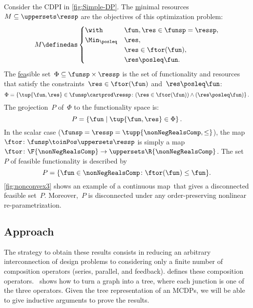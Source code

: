 \begin{example}
    \label{exa:one}
    Consider the CDPI in \cref{fig:Simple-DP}.
    The \uline{m}inimal resources~$M\subseteq\uppersets \ressp$ are the objectives of this optimization problem:
    \begin{equation*}
        M\definedas\begin{cases}
            \with          & \fun,\res\in\funsp=\ressp, \\
            \Min_{\posleq} & \res,                      \\
                           & \res\in\ftor(\fun),        \\
                           & \res\posleq\fun.
        \end{cases}
    \end{equation*}
    The \uline{fea}sible set~$\Phi\subseteq\funsp\times\ressp$ is the set of functionality and resources that satisfy the constraints~$\res\in\ftor(\fun)$ and~$\res\posleq\fun$:
    \begin{equation}
        \Phi=\left\{ \tup{\fun,\res}\in\funsp\cartprod\ressp\colon (\res\in\ftor(\fun))\wedge(\res\posleq\fun)\right\} .\label{eq:feasible}
    \end{equation}
    The \uline{p}rojection~$P$ of~$\Phi$ to the functionality space is:
    \begin{equation*}
        P=\left\{ \fun\mid\tup{\fun,\res} \in\Phi\right\}.
    \end{equation*}
    In the scalar case ($\funsp=\ressp=\tupp{\nonNegRealsComp,\leq}$), the map~$\ftor\colon\funsp\toinPos\uppersets \ressp$ is simply a map~$\ftor\colon\F{\nonNegRealsComp}\to \uppersets\R{\nonNegRealsComp}$.
    The set~$P$ of feasible functionality is described by
    \begin{equation}
        P=\{\fun\in\nonNegRealsComp\colon \ftor(\fun)\leq\fun\}.\label{eq:Pfeasible}
    \end{equation}
    \cref{fig:nonconvex3} shows an example of a continuous map~\ftor that gives a disconnected feasible set~$P$.
    Moreover,~$P$ is disconnected under any order-preserving nonlinear re-parametrization.

\end{example}

\subsection{Approach}

The strategy to obtain these results  consists in reducing an arbitrary interconnection of design problems to considering only a finite number of composition operators (series, parallel, and feedback).
 defines these composition operators.
~shows how to turn a graph into a tree, where each junction is one of the three operators.
Given the tree representation of an MCDPs, we will be able to give inductive arguments to prove the results.

